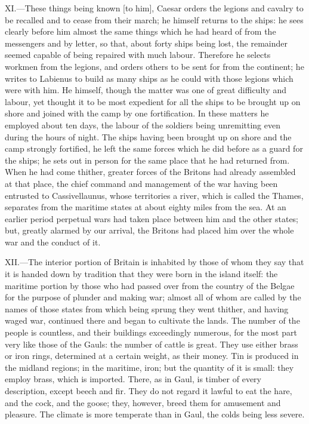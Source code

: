 XI.—These things being known [to him], Caesar orders the legions and
cavalry to be recalled and to cease from their march; he himself returns
to the ships: he sees clearly before him almost the same things which he
had heard of from the messengers and by letter, so that, about forty
ships being lost, the remainder seemed capable of being repaired with
much labour. Therefore he selects workmen from the legions, and orders
others to be sent for from the continent; he writes to Labienus to build
as many ships as he could with those legions which were with him. He
himself, though the matter was one of great difficulty and labour, yet
thought it to be most expedient for all the ships to be brought up on
shore and joined with the camp by one fortification. In these matters he
employed about ten days, the labour of the soldiers being unremitting
even during the hours of night. The ships having been brought up on
shore and the camp strongly fortified, he left the same forces which he
did before as a guard for the ships; he sets out in person for the same
place that he had returned from. When he had come thither, greater
forces of the Britons had already assembled at that place, the chief
command and management of the war having been entrusted to
Cassivellaunus, whose territories a river, which is called the Thames,
separates from the maritime states at about eighty miles from the sea.
At an earlier period perpetual wars had taken place between him and the
other states; but, greatly alarmed by our arrival, the Britons had
placed him over the whole war and the conduct of it.

XII.—The interior portion of Britain is inhabited by those of whom they
say that it is handed down by tradition that they were born in the
island itself: the maritime portion by those who had passed over from
the country of the Belgae for the purpose of plunder and making war;
almost all of whom are called by the names of those states from which
being sprung they went thither, and having waged war, continued there
and began to cultivate the lands. The number of the people is countless,
and their buildings exceedingly numerous, for the most part very like
those of the Gauls: the number of cattle is great. They use either brass
or iron rings, determined at a certain weight, as their money. Tin is
produced in the midland regions; in the maritime, iron; but the quantity
of it is small: they employ brass, which is imported. There, as in Gaul,
is timber of every description, except beech and fir. They do not regard
it lawful to eat the hare, and the cock, and the goose; they, however,
breed them for amusement and pleasure. The climate is more temperate
than in Gaul, the colds being less severe.

